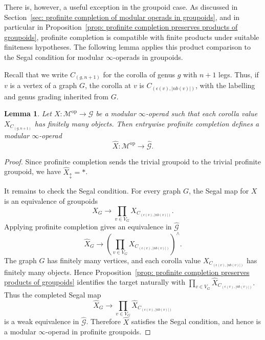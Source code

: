 \documentclass{amsart}
\newcommand{\bM}{\mathscr{M}}
\newcommand{\bS}{\mathbf{S}}
\newcommand{\Grpd}{\mathscr{G}}
\newcommand{\op}{\mathrm{op}}
\newcommand{\NS}{\widehat{\mathsf{\Gamma}}}
\newcommand{\nb}{nb}
\newtheorem{lemma}[theorem]{Lemma}%
\theoremstyle{definition}
\numberwithin{equation}{section}
\begin{document}
There is, however, a useful exception in the groupoid case. As discussed in Section~\ref{sec: profinite completion of modular operads in groupoids}, and in particular in Proposition~\ref{prop: profinite completion preserves products of groupoids}, profinite completion is compatible with finite products under suitable finiteness hypotheses. The following lemma applies this product comparison to the Segal condition for modular $\infty$-operads in groupoids. %

Recall that we write $C_{(g,n+1)}$ for the corolla of genus $g$ with $n+1$ legs. Thus, if $v$ is a vertex of a graph $G$, the corolla at $v$ is $C_{(\epsilon(v),|\nb(v)|)}$, with the labelling and genus grading inherited from $G$.

\begin{lemma}\label{lemma: profinite-completion-preserves-segal-groupoids}
Let $X:\bM^{\op}\to\Grpd$ be a modular $\infty$-operad such that each corolla value
$X_{C_{(g,n+1)}}$ has finitely many objects. Then entrywise profinite completion defines a modular $\infty$-operad
\[
\widehat X:\bM^{\op}\longrightarrow \widehat{\Grpd}.
\]
\end{lemma}

\begin{proof}
Since profinite completion sends the trivial groupoid to the trivial profinite groupoid, we have $\widehat X_{\updownarrow}=*$.

It remains to check the Segal condition. For every graph $G$, the Segal map for $X$ is an equivalence of groupoids
\[
X_G \longrightarrow \prod_{v\in V_G} X_{C_{(\epsilon(v),|\nb(v)|)}} .
\]
Applying profinite completion gives an equivalence in $\widehat{\Grpd}$
\[
\widehat X_G \longrightarrow
\left(\prod_{v\in V_G} X_{C_{(\epsilon(v),|\nb(v)|)}}\right)^{\wedge}.
\]
The graph $G$ has finitely many vertices, and each corolla value
$X_{C_{(\epsilon(v),|\nb(v)|)}}$ has finitely many objects. Hence Proposition~\ref{prop: profinite completion preserves products of groupoids} identifies the target naturally with $\prod_{v\in V_G}\widehat X_{C_{(\epsilon(v),|\nb(v)|)}}.$
Thus the completed Segal map
\[
\widehat X_G \longrightarrow
\prod_{v\in V_G}\widehat X_{C_{(\epsilon(v),|\nb(v)|)}}
\]
is a weak equivalence in $\widehat{\Grpd}$. Therefore $\widehat X$ satisfies the Segal condition, and hence is a modular $\infty$-operad in profinite groupoids.
\end{proof}
\end{document}
